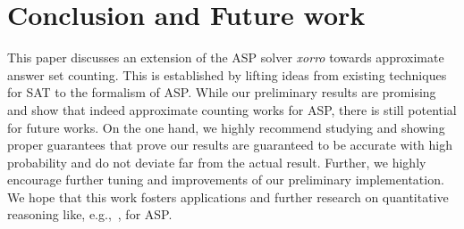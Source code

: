 \documentclass{svproc}
\newcommand{\sysfont}{\textit}
\newcommand{\xorro}{\sysfont{xorro}}
\begin{document}
\section{Conclusion and Future work} \label{sec:conclusion}
This paper discusses an extension of the ASP solver \xorro{}
towards approximate answer set counting. This is established by lifting ideas from existing techniques for SAT to the formalism of ASP.
While our preliminary results are promising and show that
indeed approximate counting works for ASP, there is still potential for future works.
On the one hand, we highly recommend studying and showing
proper guarantees that prove our results are guaranteed to be accurate with high probability and do not deviate far from the actual result.
Further, we highly encourage further tuning and improvements of our preliminary implementation.
We hope that this work fosters applications and further research on quantitative reasoning like, e.g.,~\cite{KimmigDRCR11,TsamouraGK20}, for ASP.



\end{document}
